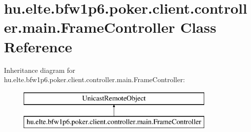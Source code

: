 \hypertarget{classhu_1_1elte_1_1bfw1p6_1_1poker_1_1client_1_1controller_1_1main_1_1_frame_controller}{}\section{hu.\+elte.\+bfw1p6.\+poker.\+client.\+controller.\+main.\+Frame\+Controller Class Reference}
\label{classhu_1_1elte_1_1bfw1p6_1_1poker_1_1client_1_1controller_1_1main_1_1_frame_controller}
Inheritance diagram for hu.\+elte.\+bfw1p6.\+poker.\+client.\+controller.\+main.\+Frame\+Controller\+:\begin{figure}[H]
\begin{center}
\leavevmode
\includegraphics[height=2.000000cm]{classhu_1_1elte_1_1bfw1p6_1_1poker_1_1client_1_1controller_1_1main_1_1_frame_controller}
\end{center}
\end{figure}
